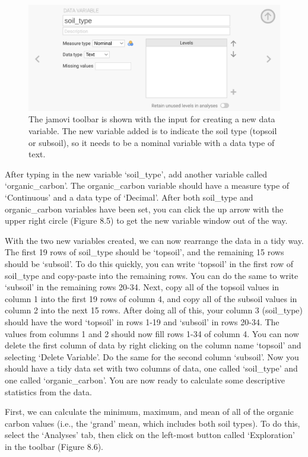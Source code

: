 \documentclass[
]{scrbook}
\begin{document}
\begin{figure}
\includegraphics[width=1\linewidth]{img/jamovi_set_variable} \caption{The jamovi toolbar is shown with the input for creating a new data variable. The new variable added is to indicate the soil type (topsoil or subsoil), so it needs to be a nominal variable with a data type of text.}\label{fig:unnamed-chunk-27}
\end{figure}

After typing in the new variable `soil\_type', add another variable called `organic\_carbon'.
The organic\_carbon variable should have a measure type of `Continuous' and a data type of `Decimal'.
After both soil\_type and organic\_carbon variables have been set, you can click the up arrow with the upper right circle (Figure 8.5) to get the new variable window out of the way.

With the two new variables created, we can now rearrange the data in a tidy way.
The first 19 rows of soil\_type should be `topsoil', and the remaining 15 rows should be `subsoil'.
To do this quickly, you can write `topsoil' in the first row of soil\_type and copy-paste into the remaining rows.
You can do the same to write `subsoil' in the remaining rows 20-34.
Next, copy all of the topsoil values in column 1 into the first 19 rows of column 4, and copy all of the subsoil values in column 2 into the next 15 rows.
After doing all of this, your column 3 (soil\_type) should have the word `topsoil' in rows 1-19 and `subsoil' in rows 20-34.
The values from columns 1 and 2 should now fill rows 1-34 of column 4.
You can now delete the first column of data by right clicking on the column name `topsoil' and selecting `Delete Variable'.
Do the same for the second column `subsoil'.
Now you should have a tidy data set with two columns of data, one called `soil\_type' and one called `organic\_carbon'.
You are now ready to calculate some descriptive statistics from the data.

First, we can calculate the minimum, maximum, and mean of all of the organic carbon values (i.e., the `grand' mean, which includes both soil types).
To do this, select the `Analyses' tab, then click on the left-most button called `Exploration' in the toolbar (Figure 8.6).
\end{document}
